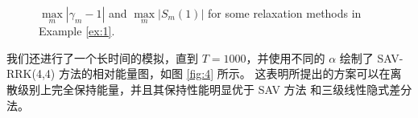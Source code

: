 	\begin{figure}[H]
		\begin{center}
		\caption{$\max\limits_m\left|\gamma_m-1\right|$ and $\max\limits_m\left|S_m(1)\right|$ for some relaxation methods in Example \ref{ex:1}.}
		\label{fig:1}
		\end{center}
		\end{figure}
		我们还进行了一个长时间的模拟，直到 $T=1000$，并使用不同的 $\alpha$ 绘制了 SAV-RRK(4,4) 方法的相对能量图，如图 \ref{fig:4} 所示。
		这表明所提出的方案可以在离散级别上完全保持能量，并且其保持性能明显优于 SAV 方法\cite{chengConvergenceEnergyconservingScheme2022} 和三级线性隐式差分法\cite{wangConservativeLinearizedDifference2015}。		


